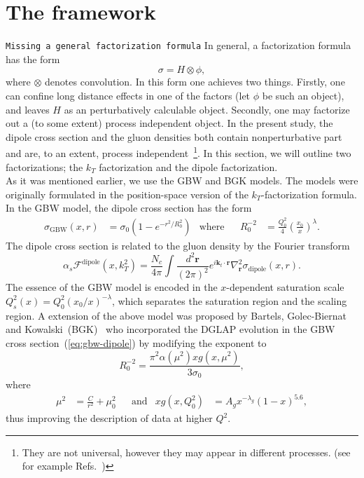 \documentclass[11pt]{article}
\newcommand{\fdp}[0]{\mathcal{F}^{\mathrm{dipole}}}
\newcommand{\commentPending}[1]{\texttt{\color{red!25}#1}}
\begin{document}
\section{The framework}
\commentPending{Missing a general factorization formula}
In general, a factorization formula has the form
\begin{equation}
    \sigma=H \otimes \phi,
\end{equation}
where $\otimes$ denotes convolution. In this form one achieves two things. Firstly, one can confine long distance effects in one of the factors (let $\phi$ be such an object), and leaves $H$ as an perturbatively calculable object. Secondly, one may factorize out a (to some extent) process independent object.  
In the present study, the dipole cross section and the gluon densities both  contain nonperturbative part and are, to an extent, process independent~\footnote{They are not universal, however they may appear in different processes. (see for example Refs.~\cite{Dominguez:2011wm,Kotko:2015ura})}.
In this section, we will outline two factorizations; the $k_T$ factorization and the dipole factorization. \\
As it was mentioned earlier, we use the GBW and BGK models.  
The models were originally formulated in the position-space version of the
$k_T$-factorization formula. %
In the GBW model, the dipole cross section has the form~\cite{Golec-Biernat:1998zce}
\begin{align}
\label{eq:gbw-dipole}
\sigma_{\mathrm{GBW}}(x,r)&=\sigma_0\left(1-e^{-r^2/R^2_0}\right)&\mathrm{where}&
&R^{-2}_0&=\frac{Q_0^{2}}{4}\left(\frac{x_0}{x}\right)^\lambda.
\end{align}
%
The dipole cross section is related to the gluon density by the Fourier
transform
%
\begin{equation}
\alpha_s\fdp(x,k_T^2)=\frac{N_c}{4\pi}\int\frac{d^2\mathbf{r}}{(2\pi)^2}e^{i\mathbf{k}_t\cdot \mathbf{r} }\nabla_{\mathbf{r}}^2\sigma_{\mathrm{dipole}}(x,r).
\label{eq:dipole-gluon}
\end{equation}
%
The essence of the GBW model is encoded in the $x$-dependent saturation scale
$Q_s^2(x)=Q^2_0(x_0/x)^{-\lambda}$, which separates the saturation region and
the scaling region.  A extension of the above model was proposed by Bartels, Golec-Biernat
and Kowalski~(BGK)~\cite{Bartels:2002cj} who incorporated the DGLAP evolution
in the GBW cross section~(\ref{eq:gbw-dipole}) by modifying the exponent to 
%
\begin{equation}
R_0^{-2}=\frac{\pi^2\alpha(\mu^2)xg(x,\mu^2)}{3\sigma_0},
\end{equation}
where
\begin{align}
\mu^2&=\frac{C}{r^2}+\mu_0^2 & &\mathrm{and} & xg(x,Q^2_0)&=A_g x^{-\lambda_g}(1-x)^{5.6},
\end{align}
%
thus improving the description of data at higher $Q^2$.\\
\end{document}
